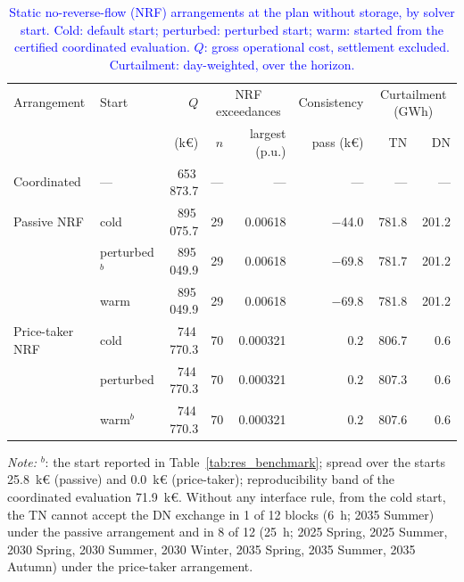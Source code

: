 \documentclass[preprint,12pt]{elsarticle}
\begin{document}
\begin{table}[htbp!]
    \centering
    \caption{\textcolor{blue}{Static no-reverse-flow (NRF) arrangements at the plan without storage, by solver start. Cold: default start; perturbed: perturbed start; warm: started from the certified coordinated evaluation. $Q$: gross operational cost, settlement excluded. Curtailment: day-weighted, over the horizon.}}
    \label{tab:appE_benchmark}
    \scriptsize\setlength{\tabcolsep}{4pt}
    \begin{tabular}{l l r r r r r r}
        \toprule
        Arrangement & Start & $Q$ & \multicolumn{2}{c}{NRF exceedances} & Consistency & \multicolumn{2}{c}{Curtailment (GWh)} \\
        \cmidrule(lr){4-5}\cmidrule(l){7-8}
         & & (k\euro) & $n$ & largest (p.u.) & pass (k\euro) & TN & DN \\
        \midrule
        Coordinated & --- & 653\,873.7 & --- & --- & --- & --- & --- \\
        \midrule
        Passive NRF & cold & 895\,075.7 & 29 & 0.00618 & $-$44.0 & 781.8 & 201.2 \\
         & perturbed$^{b}$ & 895\,049.9 & 29 & 0.00618 & $-$69.8 & 781.7 & 201.2 \\
         & warm & 895\,049.9 & 29 & 0.00618 & $-$69.8 & 781.8 & 201.2 \\
        \midrule
        Price-taker NRF & cold & 744\,770.3 & 70 & 0.000321 & 0.2 & 806.7 & 0.6 \\
         & perturbed & 744\,770.3 & 70 & 0.000321 & 0.2 & 807.3 & 0.6 \\
         & warm$^{b}$ & 744\,770.3 & 70 & 0.000321 & 0.2 & 807.6 & 0.6 \\
        \bottomrule
    \end{tabular}
    \par\smallskip
    \begin{minipage}{0.95\linewidth}
        \scriptsize\raggedright
        \textit{Note:} $^{b}$: the start reported in Table~\ref{tab:res_benchmark}; spread over the starts 25.8~k\euro{} (passive) and 0.0~k\euro{} (price-taker); reproducibility band of the coordinated evaluation 71.9~k\euro{}. Without any interface rule, from the cold start, the TN cannot accept the DN exchange in 1 of 12 blocks (6~h; 2035 Summer) under the passive arrangement and in 8 of 12 (25~h; 2025 Spring, 2025 Summer, 2030 Spring, 2030 Summer, 2030 Winter, 2035 Spring, 2035 Summer, 2035 Autumn) under the price-taker arrangement.
    \end{minipage}
\end{table}
\end{document}
